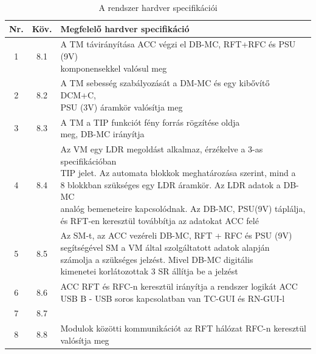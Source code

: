 \documentclass[a4paper,12pt]{article}
\begin{document}
\begin{table}[!htbp]
    \centering
    \begin{tabular}{|c|c|l|} \hline
        Nr. & Köv. & Megfelelő hardver specifikáció \\ \hline
        1 & 8.1 & \specialcell{A TM távirányítása ACC végzi el DB-MC, RFT+RFC és PSU (9V) 
                            \\komponensekkel valósul meg} \\ \hline
        2 & 8.2 & \specialcell{A TM sebesség szabályozását a DM-MC és egy kibővítő DCM+C, 
                            \\PSU (3V) áramkör valósítja meg}  \\ \hline
        3 & 8.3 & \specialcell{A TM a TIP funkciót fény forrás rögzítése oldja
                            \\meg, DB-MC irányítja} \\ \hline
		4 & 8.4 & \specialcell{Az VM egy LDR megoldást alkalmaz, érzékelve a 3-as specifikációban
		                    \\TIP jelet. Az automata blokkok meghatározása szerint, mind a 
		                    \\8 blokkban szükséges egy LDR áramkör. Az LDR adatok a DB-MC 
		                    \\analóg bemeneteire kapcsolódnak. Az DB-MC, PSU(9V) táplálja,
		                    \\és RFT-en keresztül továbbítja az adatokat ACC felé}\\ \hline
		5 & 8.5 & \specialcell{Az SM-t, az ACC vezéreli DB-MC, RFT + RFC és PSU (9V) 
		                    \\segítségével SM a VM által szolgáltatott adatok alapján
		                    \\számolja a szükséges jelzést. Mivel DB-MC digitális 
		                    \\kimenetei korlátozottak 3 SR állítja be a jelzést}\\ \hline
		6 & 8.6 & \specialcell{ACC RFT és RFC-n keresztül irányítja a rendszer logikát ACC 
		                    \\USB B - USB soros kapcsolatban van TC-GUI és RN-GUI-l}\\ \hline
		7 & 8.7 & \specialcell{IL az ACC szinten valósul meg, valójában hardver szintű szoftver} \\ \hline
		8 & 8.8 &\specialcell{Modulok közötti kommunikációt az RFT hálózat RFC-n keresztül 
		                    \\valósítja meg}\\ \hline
    \end{tabular}
    \caption[Hardver specifikáció]{A rendszer hardver specifikációi}
    \label{tab:hardspec}
\end{table}
\end{document}
